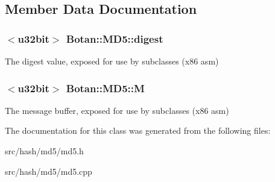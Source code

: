 \subsection{Member Data Documentation}
\hypertarget{classBotan_1_1MD5_a326a17489a1b1cf4c297b687a324533c}{
\subsubsection[{digest}]{$<${\bf u32bit}$>$ Botan\-::\-M\-D5\-::digest\hspace{0.3cm}{\ttfamily [protected]}}}\label{classBotan_1_1MD5_a326a17489a1b1cf4c297b687a324533c}
The digest value, exposed for use by subclasses (x86 asm) \hypertarget{classBotan_1_1MD5_a4c003f545d4762bed06563a1732c62e6}{
\subsubsection[{M}]{$<${\bf u32bit}$>$ Botan\-::\-M\-D5\-::\-M\hspace{0.3cm}{\ttfamily [protected]}}}\label{classBotan_1_1MD5_a4c003f545d4762bed06563a1732c62e6}
The message buffer, exposed for use by subclasses (x86 asm) 

The documentation for this class was generated from the following files\-:\begin{DoxyCompactItemize}
\item 
src/hash/md5/md5.\-h\item 
src/hash/md5/md5.\-cpp\end{DoxyCompactItemize}
